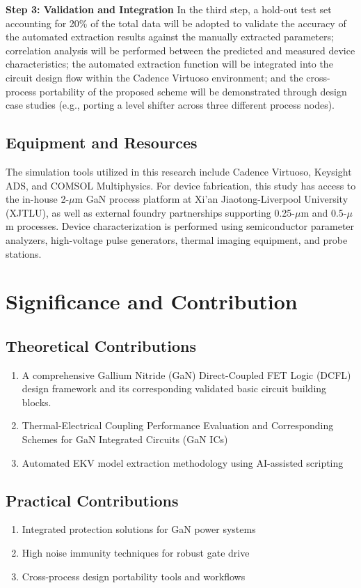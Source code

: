 \documentclass[12pt,a4paper]{article}
\begin{document}
\textbf{Step 3: Validation and Integration}
In the third step, a hold-out test set accounting for 20\% of the total data will be adopted to validate the accuracy of the automated extraction results against the manually extracted parameters; correlation analysis will be performed between the predicted and measured device characteristics; the automated extraction function will be integrated into the circuit design flow within the Cadence Virtuoso environment; and the cross-process portability of the proposed scheme will be demonstrated through design case studies (e.g., porting a level shifter across three different process nodes).


\subsection{Equipment and Resources}
The simulation tools utilized in this research include Cadence Virtuoso, Keysight ADS, and COMSOL Multiphysics. For device fabrication, this study has access to the in-house 2-$\mu$m GaN process platform at Xi'an Jiaotong-Liverpool University (XJTLU), as well as external foundry partnerships supporting 0.25-$\mu$m and 0.5-$\mu$m processes. Device characterization is performed using semiconductor parameter analyzers, high-voltage pulse generators, thermal imaging equipment, and probe stations.


\section{Significance and Contribution}

\subsection{Theoretical Contributions}
\begin{enumerate}[leftmargin=*]
    \item A comprehensive Gallium Nitride (GaN) Direct-Coupled FET Logic (DCFL) design framework and its corresponding validated basic circuit building blocks.
    \item Thermal-Electrical Coupling Performance Evaluation and Corresponding Schemes for GaN Integrated Circuits (GaN ICs)
    \item Automated EKV model extraction methodology using AI-assisted scripting
\end{enumerate}

\subsection{Practical Contributions}
\begin{enumerate}[leftmargin=*]
    \item Integrated protection solutions for GaN power systems
    \item High noise immunity techniques for robust gate drive
    \item Cross-process design portability tools and workflows
\end{enumerate}
\end{document}
